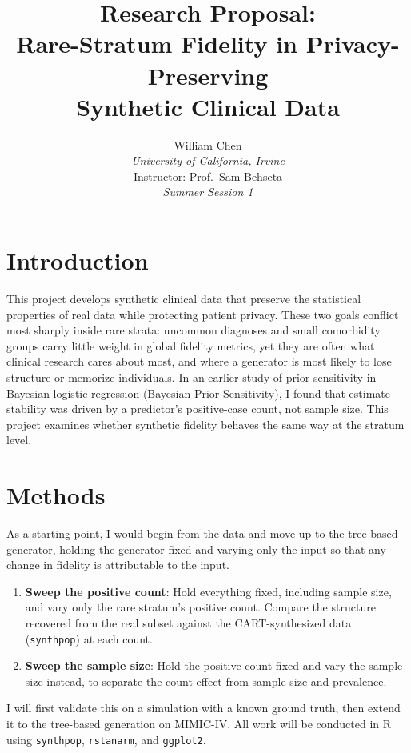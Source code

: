 \documentclass[11pt]{article}
\title{\vspace{-1.5cm}\normalsize\textbf{Research Proposal:\\
Rare-Stratum Fidelity in Privacy-Preserving\\
Synthetic Clinical Data}}
\author{
    William Chen\\
    \textit{University of California, Irvine}\\
    Instructor: Prof.\ Sam Behseta\\
    \textit{Summer Session 1}
}
\date{}
\begin{document}
\maketitle
\thispagestyle{empty}

\section*{Introduction}

This project develops synthetic clinical data that preserve the
statistical properties of real data while protecting patient privacy.
These two goals conflict most sharply inside rare strata: uncommon
diagnoses and small comorbidity groups carry little weight in global
fidelity metrics, yet they are often what clinical research cares about
most, and where a generator is most likely to lose structure or
memorize individuals. In an earlier study of prior sensitivity in
Bayesian logistic regression
(\href{https://github.com/ShengPeiWilliam/bayesian-prior-sensitivity}{Bayesian Prior Sensitivity}),
I found that estimate stability was driven by a predictor's
positive-case count, not sample size. This project examines whether
synthetic fidelity behaves the same way at the stratum level.

\section*{Methods}

As a starting point, I would begin from the data and move up to the
tree-based generator, holding the generator fixed and varying only the
input so that any change in fidelity is attributable to the input.

\begin{enumerate}
    \item \textbf{Sweep the positive count}: Hold everything fixed,
    including sample size, and vary only the rare stratum's positive
    count. Compare the structure recovered from the real subset against
    the CART-synthesized data (\texttt{synthpop}) at each count.

    \item \textbf{Sweep the sample size}: Hold the positive count
    fixed and vary the sample size instead, to separate the count
    effect from sample size and prevalence.
\end{enumerate}

I will first validate this on a simulation with a known ground truth,
then extend it to the tree-based generation on MIMIC-IV. All work will
be conducted in R using \texttt{synthpop}, \texttt{rstanarm}, and
\texttt{ggplot2}.
\end{document}
